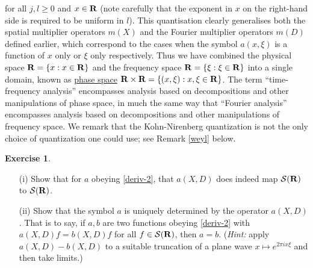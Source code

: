 \documentclass[11pt]{article}
\theoremstyle{definition}
\newtheorem{exercise}[theorem]{Exercise}
\begin{document}
 for all \({j,l \geq 0}\) and \({x \in {\bf R}}\) (note carefully that the exponent in \({x}\) on the right-hand side is required to be uniform in \({l}\)). This quantisation clearly generalises both the spatial multiplier operators \({m(X)}\) and the Fourier multiplier operators \({m(D)}\) defined earlier, which correspond to the cases when the symbol \({a(x,\xi)}\) is a function of \({x}\) only or \({\xi}\) only respectively. Thus we have combined the physical space \({{\bf R} = \{ x: x \in {\bf R}\}}\) and the frequency space \({{\bf R} = \{ \xi: \xi \in {\bf R}\}}\) into a single domain, known as \href{https://en.wikipedia.org/wiki/Phase_space}{phase space} \({{\bf R} \times {\bf R} = \{ (x,\xi): x,\xi \in {\bf R} \}}\). The term “time-frequency analysis” encompasses analysis based on decompositions and other manipulations of phase space, in much the same way that “Fourier analysis” encompasses analysis based on decompositions and other manipulations of frequency space. We remark that the Kohn-Nirenberg quantization is not the only choice of quantization one could use; see Remark \ref{weyl} below.
\begin{exercise}
 \label{unq} 
\begin{itemize}

\item[(i)] Show that for \({a}\) obeying \eqref{deriv-2}, that \({a(X,D)}\) does indeed map \({{\mathcal S}({\bf R})}\) to \({{\mathcal S}({\bf R})}\). 
\item[(ii)] Show that the symbol \({a}\) is uniquely determined by the operator \({a(X,D)}\). That is to say, if \({a,b}\) are two functions obeying \eqref{deriv-2} with \({a(X,D) f = b(X,D) f}\) for all \({f \in {\mathcal S}({\bf R})}\), then \({a=b}\). (\emph{Hint:} apply \({a(X,D)-b(X,D)}\) to a suitable truncation of a plane wave \({x \mapsto e^{2\pi i x \xi}}\) and then take limits.)


\end{itemize}

\end{exercise}
\end{document}

